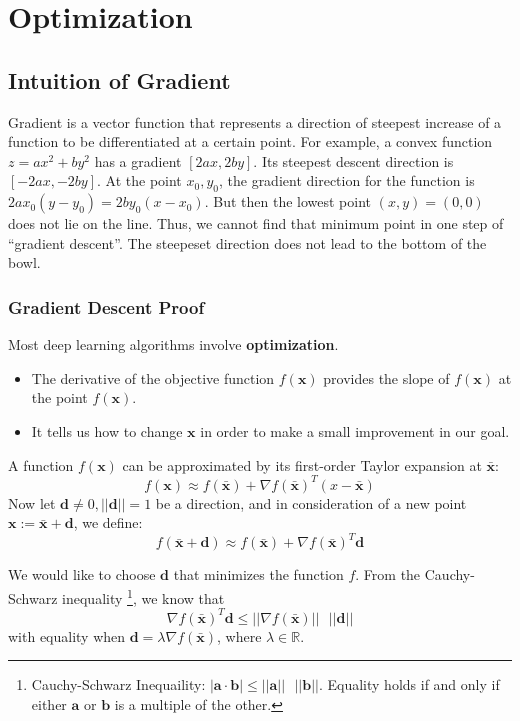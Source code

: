 \chapter{Optimization}
\label{ch:optimization}

\section{Intuition of Gradient}

Gradient is a vector function that represents a direction of steepest increase of a function to be differentiated at a certain point. For example, a convex function $z = ax^2+by^2$ has a gradient $[2ax, 2by]$. Its steepest descent direction is $[-2ax, -2by]$. At the point $x_0,y_0$, the gradient direction for the function is $2ax_0(y-y_0) = 2by_0(x-x_0)$. But then the lowest point $(x,y) = (0,0)$ does not lie on the line. Thus, we cannot find that minimum point in one step of ``gradient descent''. The steepeset direction does not lead to the bottom of the bowl. 

\subsection{Gradient Descent Proof}

Most deep learning algorithms involve \textbf{optimization}.

\begin{itemize}
	\item The derivative of the objective function $f(\mathbf{x})$ provides the slope of $f(\mathbf{x})$ at the point $f(\mathbf{x})$.
	\item It tells us how to change $\mathbf{x}$ in order to make a small improvement in our goal.
\end{itemize}

	A function $f(\mathbf{x})$ can be approximated by its first-order Taylor expansion at $\bar{\mathbf{x}}$:
	$$f(\mathbf{x})\approx f(\bar{\mathbf{x}})+\nabla f(\bar{\mathbf{x}})^T(x-\bar{\mathbf{x}})$$
	Now let $\mathbf{d}\neq0, ||\mathbf{d}||=1$ be a direction, and in consideration of a new point $\mathbf{x}:=\bar{\mathbf{x}}+\mathbf{d}$, we define:
	$$f(\bar{\mathbf{x}}+\mathbf{d})\approx f(\bar{\mathbf{x}})+\nabla f(\bar{\mathbf{x}})^T\mathbf{d}$$

We would like to choose $\mathbf{d}$ that minimizes the function $f$. From the Cauchy-Schwarz inequality \footnote{Cauchy-Schwarz Inequaility: $|\mathbf{a}\cdot \mathbf{b}|\leq ||\mathbf{a}||\textrm{ } ||\mathbf{b}||$. Equality holds if and only if either $\mathbf{a}$ or $\mathbf{b}$ is a multiple of the other.}, we know that
$$\nabla f(\bar{\mathbf{x}})^T\mathbf{d}\leq ||\nabla f(\bar{\mathbf{x}})||\textrm{ }||\mathbf{d}||$$
with equality when $\mathbf{d}=\lambda \nabla f(\bar{\mathbf{x}})$, where $\lambda\in \mathbb{R}$.

